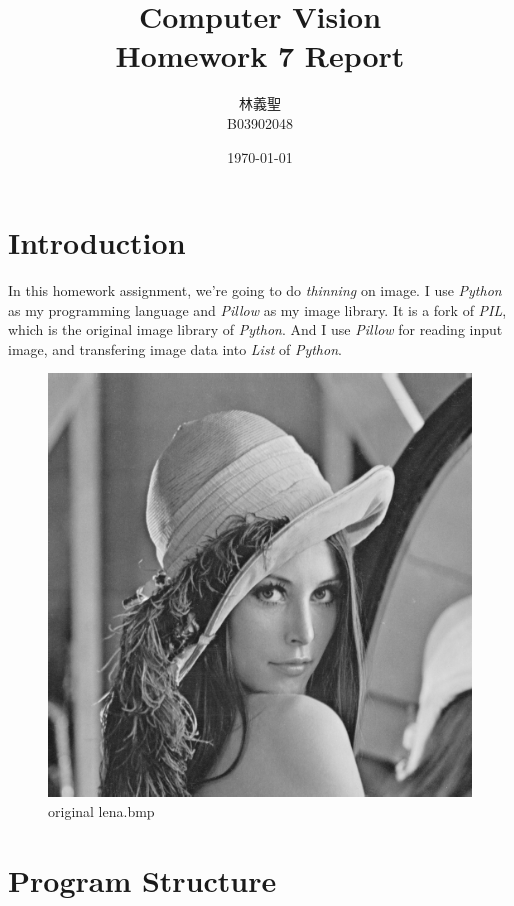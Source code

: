 \documentclass[14pt,a4paper]{extarticle}
\title{Computer Vision\\Homework 7 Report}
\author{林義聖\\B03902048}
\date{\today}
\begin{document}
\maketitle
\thispagestyle{fancy}

\section*{Introduction}

In this homework assignment, we're going to do \textit{thinning} on image. I use \textit{Python} as my programming language and \textit{Pillow} as my image library. It is a fork of \textit{PIL}, which is the original image library of \textit{Python}. And I use \textit{Pillow} for reading input image, and transfering image data into \textit{List} of \textit{Python}.

\begin{figure}[H]
\centering
\includegraphics[scale=0.5]{lena.bmp}
\caption{original lena.bmp}
\label{fig:lena.bmp}
\end{figure}

\section*{Program Structure}
\end{document}
